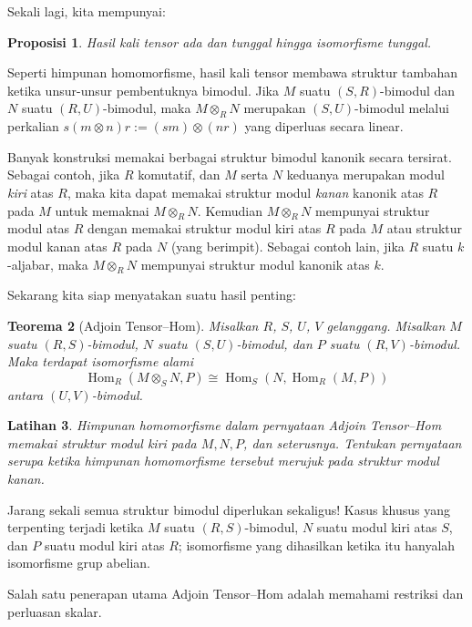 \documentclass[12pt]{article}
\theoremstyle{plain}
\newtheorem{theorem}{Teorema}[section]
\newtheorem{proposition}[theorem]{Proposisi}
\newtheorem{exercise}[theorem]{Latihan}
\theoremstyle{definition}
\theoremstyle{remark}
\numberwithin{equation}{section}
\begin{document}
Sekali lagi, kita mempunyai:

\begin{proposition}
Hasil kali tensor ada dan tunggal hingga isomorfisme tunggal.
\end{proposition}

Seperti himpunan homomorfisme, hasil kali tensor membawa struktur
tambahan ketika unsur-unsur pembentuknya bimodul.
Jika $M$ suatu $(S,R)$-bimodul dan $N$ suatu $(R,U)$-bimodul,
maka $M \otimes_R N$ merupakan $(S,U)$-bimodul melalui perkalian
$s(m\otimes n)r := (sm) \otimes (nr)$ yang diperluas secara linear.

Banyak konstruksi memakai berbagai struktur bimodul kanonik
secara tersirat.
Sebagai contoh, jika $R$ komutatif, dan $M$ serta $N$ keduanya merupakan
modul \emph{kiri} atas $R$, maka kita dapat memakai struktur
modul \emph{kanan} kanonik atas $R$ pada $M$
untuk memaknai $M \otimes_R N$.
Kemudian $M \otimes_R N$ mempunyai struktur modul atas $R$ dengan memakai struktur
modul kiri atas $R$ pada $M$ atau struktur modul kanan atas $R$ pada $N$
(yang berimpit).
Sebagai contoh lain, jika $R$ suatu $k$-aljabar, maka $M \otimes_R N$
mempunyai struktur modul kanonik atas $k$.

Sekarang kita siap menyatakan suatu hasil penting:

\begin{theorem}[Adjoin Tensor--Hom]
Misalkan $R$, $S$, $U$, $V$ gelanggang.
Misalkan $M$ suatu $(R,S)$-bimodul, $N$ suatu $(S,U)$-bimodul,
dan $P$ suatu $(R,V)$-bimodul.
Maka terdapat isomorfisme alami
\[
\operatorname{Hom}_R(M \otimes_S N,P)
\cong \operatorname{Hom}_S(N,\operatorname{Hom}_R(M,P))
\]
antara $(U,V)$-bimodul.
\end{theorem}

\begin{exercise}
Himpunan homomorfisme dalam pernyataan Adjoin Tensor--Hom
memakai struktur modul \emph{kiri} pada $M,N,P$, dan seterusnya.
Tentukan pernyataan serupa ketika himpunan homomorfisme tersebut
merujuk pada struktur modul \emph{kanan}.
\end{exercise}

Jarang sekali semua struktur bimodul diperlukan sekaligus!
Kasus khusus yang terpenting terjadi ketika $M$ suatu $(R,S)$-bimodul,
$N$ suatu modul kiri atas $S$, dan $P$ suatu modul kiri atas $R$;
isomorfisme yang dihasilkan ketika itu hanyalah isomorfisme grup abelian.

Salah satu penerapan utama Adjoin Tensor--Hom adalah
memahami restriksi dan perluasan skalar.
\end{document}
